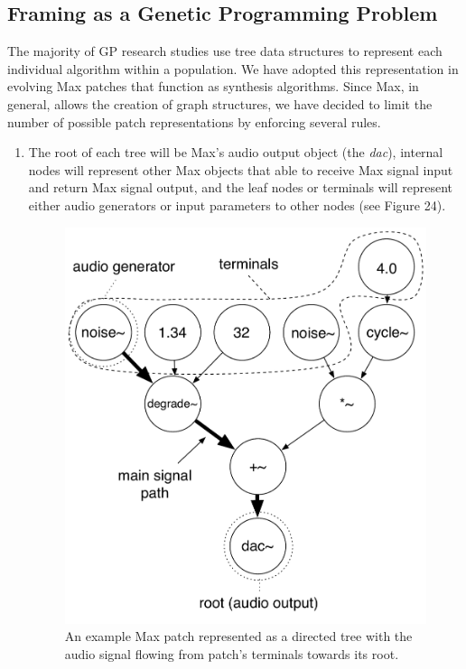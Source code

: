 \documentclass[12pt]{report} 	%
\numberwithin{figure}{chapter}
\numberwithin{table}{chapter}
\numberwithin{equation}{chapter}
\begin{document}
\begin{flushleft}
\subsection{Framing as a Genetic Programming Problem}
The majority of GP research studies use tree data structures to represent each individual algorithm within a population. We have adopted this representation in evolving Max patches that function as synthesis algorithms. Since Max, in general, allows the creation of graph structures, we have decided to limit the number of possible patch representations by enforcing several rules. 
\begin{enumerate}
\item The root of each tree will be Max's audio output object (the \textit{dac\texttildelow{}}), internal nodes will represent other Max objects that able to receive Max signal input and return Max signal output, and the leaf nodes or terminals will represent either audio generators or input parameters to other nodes (see Figure 24).
\begin{figure}[h!]
\begin{center}
\includegraphics[scale=0.7]{RootTreeFIg}
\caption[A Max patch as a directed tree]{An example Max patch represented as a directed tree with the audio signal flowing from patch's terminals towards its root.}
\end{center}
\end{figure}


\end{enumerate}
\end{flushleft}
\end{document}

